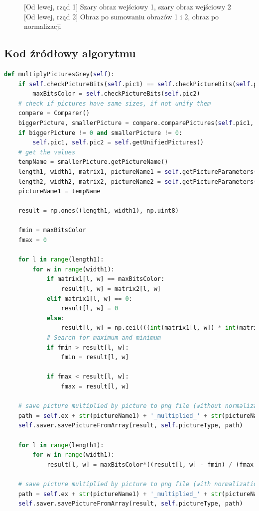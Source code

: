 \documentclass[a4paper,12pt, titlepage]{report}
\begin{document}
\begin{figure}[h]
    \caption{[Od lewej, rząd 1] Szary obraz wejściowy 1, szary obraz wejściowy 2 [Od lewej, rząd 2] Obraz po sumowaniu obrazów 1 i 2, obraz po normalizacji}%
    \label{fig:rysunek}%
\end{figure}
\FloatBarrier
\subsection*{Kod źródłowy algorytmu}
\begin{lstlisting}[language=Python]
def multiplyPicturesGrey(self):
    if self.checkPictureBits(self.pic1) == self.checkPictureBits(self.pic2):
        maxBitsColor = self.checkPictureBits(self.pic2)
    # check if pictures have same sizes, if not unify them
    compare = Comparer()
    biggerPicture, smallerPicture = compare.comparePictures(self.pic1, self.pic2)
    if biggerPicture != 0 and smallerPicture != 0:
        self.pic1, self.pic2 = self.getUnifiedPictures()
    # get the values
    tempName = smallerPicture.getPictureName()
    length1, width1, matrix1, pictureName1 = self.getPictureParameters(self.pic1)
    length2, width2, matrix2, pictureName2 = self.getPictureParameters(self.pic2)
    pictureName1 = tempName

    result = np.ones((length1, width1), np.uint8)

    fmin = maxBitsColor
    fmax = 0

    for l in range(length1):
        for w in range(width1):
            if matrix1[l, w] == maxBitsColor:
                result[l, w] = matrix2[l, w]
            elif matrix1[l, w] == 0:
                result[l, w] = 0
            else:
                result[l, w] = np.ceil(((int(matrix1[l, w]) * int(matrix2[l, w])) / maxBitsColor))
            # Search for maximum and minimum
            if fmin > result[l, w]:
                fmin = result[l, w]

            if fmax < result[l, w]:
                fmax = result[l, w]

    # save picture multiplied by picture to png file (without normalization)
    path = self.ex + str(pictureName1) + '_multiplied_' + str(pictureName2) + '.png'
    self.saver.savePictureFromArray(result, self.pictureType, path)

    for l in range(length1):
        for w in range(width1):
            result[l, w] = maxBitsColor*((result[l, w] - fmin) / (fmax - fmin))

    # save picture multiplied by picture to png file (with normalization)
    path = self.ex + str(pictureName1) + '_multiplied_' + str(pictureName2) + '_normalized.png'
    self.saver.savePictureFromArray(result, self.pictureType, path)
\end{lstlisting}
\end{document}
